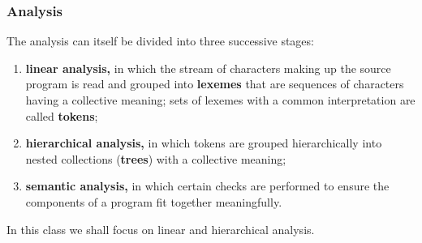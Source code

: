 % 
\begin{frame}
\frametitle{Analysis}

The analysis can itself be divided into three successive stages:
\begin{enumerate}

  \item \textbf{linear analysis,} in which the stream of characters
    making up the source program is read and grouped into
    \textbf{lexemes} that are sequences of characters having a
    collective meaning; sets of lexemes with a common interpretation
    are called \textbf{tokens};

  \item \textbf{hierarchical analysis,} in which tokens are grouped
    hierarchically into nested collections (\textbf{trees}) with a
    collective meaning;

  \item \textbf{semantic analysis,} in which certain checks are
    performed to ensure the components of a program fit together
    meaningfully.

\end{enumerate}
In this class we shall focus on linear and hierarchical analysis.

\end{frame}

